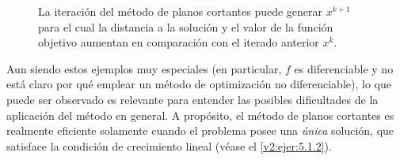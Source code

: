 \begin{figure}[htpb]
    \centering
    \caption{La iteración del método de planos cortantes puede generar $x^{k+1}$ para el cual la distancia a la solución y el valor de la función objetivo aumentan en comparación con el iterado anterior $x^k$.}
    \label{v2:fig:5.2.3}
\end{figure}

Aun siendo estos ejemplos muy especiales (en particular, $f$ es diferenciable y no está claro por qué emplear un método de optimización no diferenciable), lo que puede ser observado es relevante para entender las posibles dificultades de la aplicación del método en general. A propósito, el método de planos cortantes es realmente eficiente solamente cuando el problema posee una \textit{única} solución, que satisface la condición de crecimiento lineal (véase el \cref{v2:ejer:5.1.2}).

